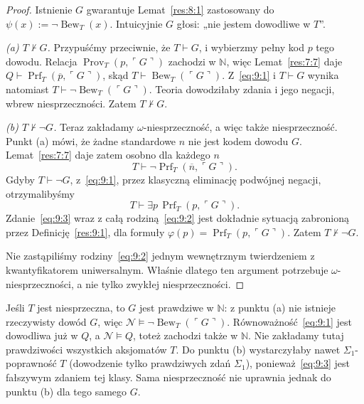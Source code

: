 \begin{proof}
Istnienie $G$ gwarantuje Lemat~\ref{res:8:1} zastosowany do $\psi(x):=\neg\operatorname{Bew}_T(x)$. Intuicyjnie $G$ głosi: „nie jestem dowodliwe w $T$”.

\emph{(a) $T\nvdash G$.} Przypuśćmy przeciwnie, że $T\vdash G$, i wybierzmy pełny kod $p$ tego dowodu. Relacja $\operatorname{Prov}_T(p,\ulcorner G\urcorner)$ zachodzi w $\mathbb N$, więc Lemat~\ref{res:7:7} daje $Q\vdash\operatorname{Prf}_T(\overline p,\ulcorner G\urcorner)$, skąd $T\vdash\operatorname{Bew}_T(\ulcorner G\urcorner)$. Z~\eqref{eq:9:1} i $T\vdash G$ wynika natomiast $T\vdash\neg\operatorname{Bew}_T(\ulcorner G\urcorner)$. Teoria dowodziłaby zdania i jego negacji, wbrew niesprzeczności. Zatem $T\nvdash G$.

\emph{(b) $T\nvdash\neg G$.} Teraz zakładamy $\omega$-niesprzeczność, a więc także niesprzeczność. Punkt (a) mówi, że żadne standardowe $n$ nie jest kodem dowodu $G$. Lemat~\ref{res:7:7} daje zatem osobno dla każdego $n$
\begin{equation}\label{eq:9:2}
T\vdash\neg\operatorname{Prf}_T(\overline n,\ulcorner G\urcorner).
\end{equation}
Gdyby $T\vdash\neg G$, z~\eqref{eq:9:1}, przez klasyczną eliminację podwójnej negacji, otrzymalibyśmy
\begin{equation}\label{eq:9:3}
T\vdash\exists p\,\operatorname{Prf}_T(p,\ulcorner G\urcorner).
\end{equation}
Zdanie~\eqref{eq:9:3} wraz z całą rodziną~\eqref{eq:9:2} jest dokładnie sytuacją zabronioną przez Definicję~\ref{res:9:1}, dla formuły $\varphi(p)=\operatorname{Prf}_T(p,\ulcorner G\urcorner)$. Zatem $T\nvdash\neg G$.

Nie zastąpiliśmy rodziny~\eqref{eq:9:2} jednym wewnętrznym twierdzeniem z kwantyfikatorem uniwersalnym. Właśnie dlatego ten argument potrzebuje $\omega$-niesprzeczności, a nie tylko zwykłej niesprzeczności.
\end{proof}

\begin{uwaga}\label{res:9:3}
Jeśli $T$ jest niesprzeczna, to $G$ jest prawdziwe w $\mathbb N$: z punktu (a) nie istnieje rzeczywisty dowód $G$, więc $\mathcal N\models\neg\operatorname{Bew}_T(\ulcorner G\urcorner)$. Równoważność~\eqref{eq:9:1} jest dowodliwa już w $Q$, a $\mathcal N\models Q$, toteż zachodzi także w $\mathbb N$. Nie zakładamy tutaj prawdziwości wszystkich aksjomatów $T$. Do punktu (b) wystarczyłaby nawet $\Sigma_1$-poprawność $T$ (dowodzenie tylko prawdziwych zdań $\Sigma_1$), ponieważ~\eqref{eq:9:3} jest fałszywym zdaniem tej klasy. Sama niesprzeczność nie uprawnia jednak do punktu (b) dla tego samego $G$.
\end{uwaga}

